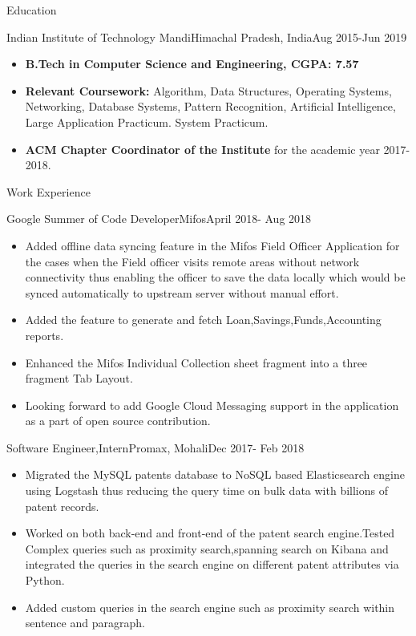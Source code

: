 \documentclass[]{mcdowellcv}
\begin{document}
	\makeheader
	
	\begin{cvsection}{Education}
	\bigbreak
		\begin{cvsubsection}{Indian Institute of Technology Mandi}{Himachal Pradesh, India}{Aug 2015-Jun 2019}	
		\bigbreak
			
			\begin{itemize}
				\item \textbf{B.Tech in Computer Science and Engineering, CGPA: 7.57}
				\item \textbf{Relevant Coursework:} Algorithm, Data Structures, Operating Systems, Networking, Database Systems, Pattern Recognition, Artificial Intelligence, Large Application Practicum. System Practicum.
				\item \textbf{ACM Chapter Coordinator of the Institute} for the academic year 2017-2018.
			\end{itemize}
		\end{cvsubsection}
	\end{cvsection}
	
	\begin{cvsection}{Work Experience}
	\bigbreak
		\begin{cvsubsection}{Google Summer of Code  Developer}{Mifos}{April 2018- Aug 2018}
		\bigbreak
			\begin{itemize}
				\item Added offline data syncing feature in the Mifos Field Officer Application for the cases when the Field officer visits remote areas without network connectivity thus enabling the officer to save the data locally which would be synced automatically to upstream server without manual effort.
				\item Added the feature to generate and fetch Loan,Savings,Funds,Accounting reports.
				\item Enhanced the Mifos Individual Collection sheet fragment into a three fragment Tab Layout.
				\item Looking forward to add Google Cloud Messaging support in the application as a part of open source contribution.
			\end{itemize}
		\end{cvsubsection}
		\begin{cvsubsection}{Software Engineer,Intern}{Promax, Mohali}{Dec 2017- Feb 2018}
		\bigbreak
			\begin{itemize}
				\item Migrated the MySQL patents database to NoSQL based Elasticsearch engine using Logstash thus reducing the query time on bulk data with billions of patent records.
				\item Worked on both back-end and front-end of the patent search engine.Tested Complex queries such as proximity search,spanning search on Kibana and integrated the queries in the search engine on different patent attributes via Python.
				\item Added custom queries in the search engine such as proximity search within sentence and paragraph.
			\end{itemize}
		\end{cvsubsection}
	\end{cvsection}
	
\end{document}
